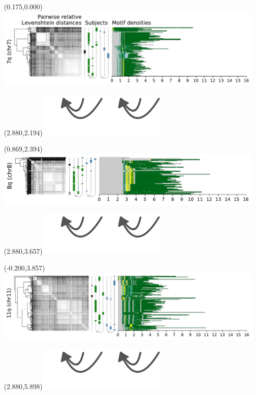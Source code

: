 \documentclass{article}
\begin{document}
\begin{textblock}{13}(0.175,0.000)\includegraphics{Figure_5/chr7.pdf}\end{textblock}
\begin{textblock}{13}(2.880,2.194)\includegraphics[width=.81in,keepaspectratio]{Figure_4/fatter-arrows.pdf}\end{textblock}
\begin{textblock}{13}(0.869,2.394)\includegraphics{Figure_5/chr8.pdf}\end{textblock}
\begin{textblock}{13}(2.880,3.657)\includegraphics[width=.81in,keepaspectratio]{Figure_4/fatter-arrows.pdf}\end{textblock}
\begin{textblock}{13}(-0.200,3.857)\includegraphics{Figure_5/chr11.pdf}\end{textblock}
\begin{textblock}{13}(2.880,5.898)\includegraphics[width=.81in,keepaspectratio]{Figure_4/fatter-arrows.pdf}\end{textblock}
\end{document}

